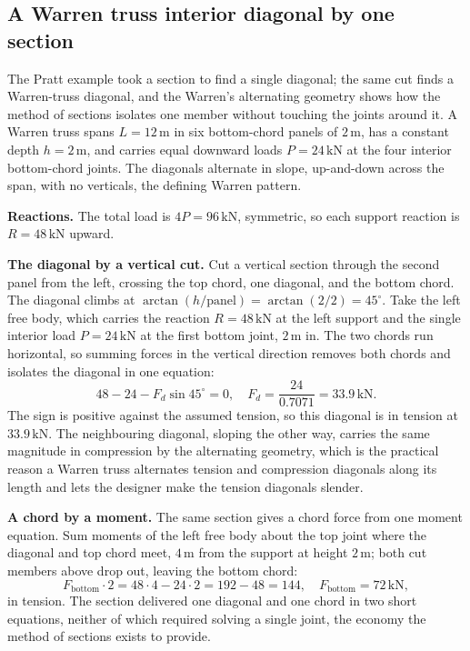 \subsection{A Warren truss interior diagonal by one section}

The Pratt example took a section to find a single diagonal; the same cut
finds a Warren-truss diagonal, and the Warren's alternating geometry shows
how the method of sections isolates one member without touching the joints
around it. A Warren truss spans $L = 12\,\si{\meter}$ in six bottom-chord
panels of $2\,\si{\meter}$, has a constant depth $h = 2\,\si{\meter}$, and
carries equal downward loads $P = 24\,\text{kN}$ at the four interior
bottom-chord joints. The diagonals alternate in slope, up-and-down across
the span, with no verticals, the defining Warren pattern.

\textbf{Reactions.} The total load is $4P = 96\,\text{kN}$, symmetric, so
each support reaction is $R = 48\,\text{kN}$ upward.

\textbf{The diagonal by a vertical cut.} Cut a vertical section through the
second panel from the left, crossing the top chord, one diagonal, and the
bottom chord. The diagonal climbs at $\arctan(h/\text{panel}) =
\arctan(2/2) = 45^{\circ}$. Take the left free body, which carries the
reaction $R = 48\,\text{kN}$ at the left support and the single interior
load $P = 24\,\text{kN}$ at the first bottom joint, $2\,\si{\meter}$ in. The
two chords run horizontal, so summing forces in the vertical direction
removes both chords and isolates the diagonal in one equation:
\[
48 - 24 - F_d \sin 45^{\circ} = 0, \quad
F_d = \frac{24}{0.7071} = 33.9\,\text{kN}.
\]
The sign is positive against the assumed tension, so this diagonal is in
tension at $33.9\,\text{kN}$. The neighbouring diagonal, sloping the other
way, carries the same magnitude in compression by the alternating geometry,
which is the practical reason a Warren truss alternates tension and
compression diagonals along its length and lets the designer make the
tension diagonals slender.

\textbf{A chord by a moment.} The same section gives a chord force from one
moment equation. Sum moments of the left free body about the top joint where
the diagonal and top chord meet, $4\,\si{\meter}$ from the support at height
$2\,\si{\meter}$; both cut members above drop out, leaving the bottom chord:
\[
F_{\text{bottom}} \cdot 2 = 48 \cdot 4 - 24 \cdot 2 = 192 - 48 = 144, \quad
F_{\text{bottom}} = 72\,\text{kN},
\]
in tension. The section delivered one diagonal and one chord in two short
equations, neither of which required solving a single joint, the economy the
method of sections exists to provide.

